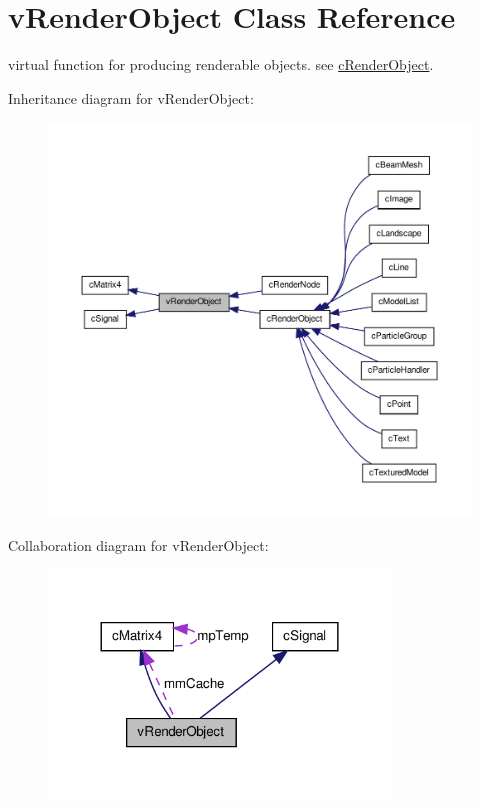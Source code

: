\hypertarget{classv_render_object}{
\section{vRenderObject Class Reference}
\label{classv_render_object}
}


virtual function for producing renderable objects. see \hyperlink{classc_render_object}{cRenderObject}.  




Inheritance diagram for vRenderObject:
\nopagebreak
\begin{figure}[H]
\begin{center}
\leavevmode
\includegraphics[width=400pt]{classv_render_object__inherit__graph}
\end{center}
\end{figure}


Collaboration diagram for vRenderObject:
\nopagebreak
\begin{figure}[H]
\begin{center}
\leavevmode
\includegraphics[width=257pt]{classv_render_object__coll__graph}
\end{center}
\end{figure}
